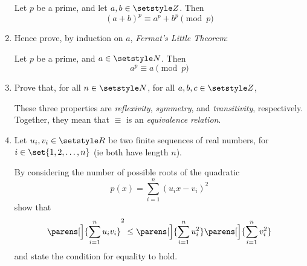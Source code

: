 \begin{enumerate}
  Let \(p\) be a prime, and let \(a, b \in \Integers\). Then
  \begin{equation*}
   (a + b)^p \equiv a^p + b^p \pmod p
  \end{equation*}
 \item
  Hence prove, by induction on \(a\), \emph{Fermat's Little Theorem}:

  Let \(p\) be a prime, and \(a \in \Naturals\). Then
  \begin{equation*}
   a^p \equiv a \pmod p
  \end{equation*}
 \item
  Prove that, for all \(n \in \Naturals\), for all \(a, b, c \in \Integers\),
  These three properties are \emph{reflexivity}, \emph{symmetry}, and
  \emph{transitivity}, respectively. Together, they mean that \(\equiv\) is an
  \emph{equivalence relation}.
 \item
  Let \(u_i, v_i \in \Reals\) be two finite sequences of real numbers, for
  \(i \in \set{1, 2, \dotsc, n}\) (ie both have length \(n\)).

  By considering the number of possible roots of the quadratic
  \begin{equation*}
   p(x) = \sum_{i = 1}^n (u_i x - v_i)^2
  \end{equation*}
  show that
  \begin{equation*}
   \parens[\Big]{\sum_{i = 1}^n u_i v_i}^2
   \le \parens[\Big]{\sum_{i = 1}^n u_i^2}
       \parens[\Big]{\sum_{i = 1}^n v_i^2}
  \end{equation*}
  and state the condition for equality to hold.


\end{enumerate}
